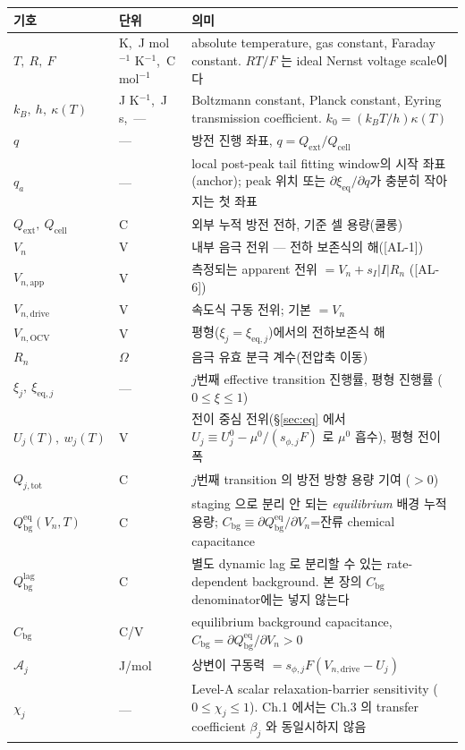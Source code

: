 \documentclass[11pt,a4paper]{article}
\newcommand{\eq}{\mathrm{eq}}
\newcommand{\app}{\mathrm{app}}
\newcommand{\drive}{\mathrm{drive}}
\newcommand{\bg}{\mathrm{bg}}
\newcommand{\cell}{\mathrm{cell}}
\newcommand{\ext}{\mathrm{ext}}
\newcommand{\OCV}{\mathrm{OCV}}
\newcommand{\tot}{\mathrm{tot}}
\newcommand{\AL}[1]{\textsf{[AL-#1]}}
\begin{document}
\begin{longtable}{p{} p{} p{}}
\toprule 기호 & 단위 & 의미 \\ \midrule \endhead
$T,\ R,\ F$ & K,\ J mol$^{-1}$ K$^{-1}$,\ C mol$^{-1}$ & absolute temperature, gas constant, Faraday constant. $RT/F$ 는 ideal Nernst voltage scale이다 \\
$k_B,\ h,\ \kappa(T)$ & J K$^{-1}$,\ J s,\ --- & Boltzmann constant, Planck constant, Eyring transmission coefficient. $k_0=(k_BT/h)\kappa(T)$ \\
$q$ & --- & 방전 진행 좌표, $q=Q_\ext/Q_\cell$ \\
$q_a$ & --- & local post-peak tail fitting window의 시작 좌표(anchor); peak 위치 또는 $\partial\xi_\eq/\partial q$가 충분히 작아지는 첫 좌표 \\
$Q_\ext,\ Q_\cell$ & C & 외부 누적 방전 전하, 기준 셀 용량(쿨롱) \\
$V_n$ & V & 내부 음극 전위 — 전하 보존식의 해(\AL{1}) \\
$V_{n,\app}$ & V & 측정되는 apparent 전위 $=V_n+s_I|I|R_n$ (\AL{6}) \\
$V_{n,\drive}$ & V & 속도식 구동 전위; 기본 $=V_n$ \\
$V_{n,\OCV}$ & V & 평형($\xi_j=\xi_{\eq,j}$)에서의 전하보존식 해 \\
$R_n$ & $\Omega$ & 음극 유효 분극 계수(전압축 이동) \\
$\xi_j,\ \xi_{\eq,j}$ & --- & $j$번째 effective transition 진행률, 평형 진행률 ($0\!\le\!\xi\!\le\!1$) \\
$U_j(T),\ w_j(T)$ & V & 전이 중심 전위(\S\ref{sec:eq} 에서 $U_j\equiv U_j^0-\mu^0/(s_{\phi,j}F)$ 로 $\mu^0$ 흡수), 평형 전이 폭 \\
$Q_{j,\tot}$ & C & $j$번째 transition 의 방전 방향 용량 기여 ($>0$) \\
$Q_\bg^{\eq}(V_n,T)$ & C & staging 으로 분리 안 되는 \emph{equilibrium} 배경 누적 용량; $C_\bg\equiv\partial Q_\bg^{\eq}/\partial V_n$=잔류 chemical capacitance \\
$Q_\bg^{\mathrm{lag}}$ & C & 별도 dynamic lag 로 분리할 수 있는 rate-dependent background. 본 장의 $C_\bg$ denominator에는 넣지 않는다 \\
$C_\bg$ & C/V & equilibrium background capacitance, $C_\bg=\partial Q_\bg^{\eq}/\partial V_n>0$ \\
$\mathcal A_j$ & J/mol & 상변이 구동력 $=s_{\phi,j}F(V_{n,\drive}-U_j)$ \\
$\chi_j$ & --- & Level-A scalar relaxation-barrier sensitivity ($0\le\chi_j\le1$). Ch.1 에서는 Ch.3 의 transfer coefficient $\beta_j$ 와 동일시하지 않음 \\

\end{longtable}
\end{document}
